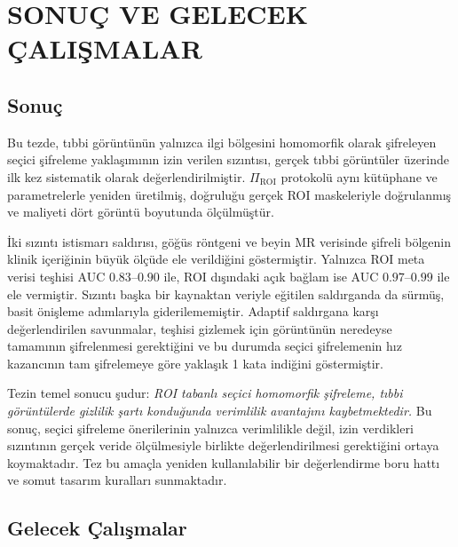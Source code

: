 \chapter{SONUÇ VE GELECEK ÇALIŞMALAR}\label{CH6}

\section{Sonuç}\label{sec:sonuc}

Bu tezde, tıbbi görüntünün yalnızca ilgi bölgesini homomorfik olarak şifreleyen seçici şifreleme yaklaşımının izin verilen sızıntısı, gerçek tıbbi görüntüler üzerinde ilk kez sistematik olarak değerlendirilmiştir. $\Pi_{\mathrm{ROI}}$ protokolü aynı kütüphane ve parametrelerle yeniden üretilmiş, doğruluğu gerçek ROI maskeleriyle doğrulanmış ve maliyeti dört görüntü boyutunda ölçülmüştür.

İki sızıntı istismarı saldırısı, göğüs röntgeni ve beyin MR verisinde şifreli bölgenin klinik içeriğinin büyük ölçüde ele verildiğini göstermiştir. Yalnızca ROI meta verisi teşhisi AUC $0.83$--$0.90$ ile, ROI dışındaki açık bağlam ise AUC $0.97$--$0.99$ ile ele vermiştir. Sızıntı başka bir kaynaktan veriyle eğitilen saldırganda da sürmüş, basit önişleme adımlarıyla giderilememiştir. Adaptif saldırgana karşı değerlendirilen savunmalar, teşhisi gizlemek için görüntünün neredeyse tamamının şifrelenmesi gerektiğini ve bu durumda seçici şifrelemenin hız kazancının tam şifrelemeye göre yaklaşık 1 kata indiğini göstermiştir.

Tezin temel sonucu şudur: \emph{ROI tabanlı seçici homomorfik şifreleme, tıbbi görüntülerde gizlilik şartı konduğunda verimlilik avantajını kaybetmektedir.} Bu sonuç, seçici şifreleme önerilerinin yalnızca verimlilikle değil, izin verdikleri sızıntının gerçek veride ölçülmesiyle birlikte değerlendirilmesi gerektiğini ortaya koymaktadır. Tez bu amaçla yeniden kullanılabilir bir değerlendirme boru hattı ve somut tasarım kuralları sunmaktadır.

\section{Gelecek Çalışmalar}\label{sec:gelecek}

